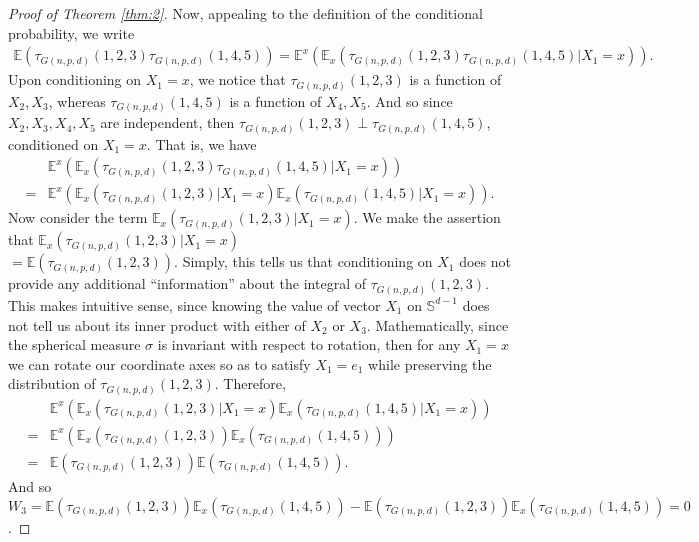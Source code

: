 \documentclass{article}
\begin{document}
\begin{proof}[Proof of Theorem \ref{thm:2}]
Now, appealing to the definition of the conditional probability, we write
\begin{align*}
    \mathbb{E} \left( \tau_{G(n,p,d)}(1,2,3)\tau_{G(n,p,d)}(1,4,5) \right) = \mathbb{E}^x\left(\mathbb{E}_x \left( \tau_{G(n,p,d)}(1,2,3)\tau_{G(n,p,d)}(1,4,5) | X_1 = x \right) \right).
\end{align*}
Upon conditioning on $X_1 = x$, we notice that $\tau_{G(n,p,d)}(1,2,3)$ is a function of $X_2, X_3$, whereas $\tau_{G(n,p,d)}(1,4,5)$ is a function of $X_4, X_5$. And so since $X_2, X_3, X_4, X_5$ are independent, then $\tau_{G(n,p,d)}(1,2,3) \perp \tau_{G(n,p,d)}(1,4,5)$, conditioned on $X_1 = x$. That is, we have
\begin{align*}
    &\mathbb{E}^x\left(\mathbb{E}_x \left( \tau_{G(n,p,d)}(1,2,3)\tau_{G(n,p,d)}(1,4,5) | X_1 = x \right) \right)\\
    =&\mathbb{E}^x\left(\mathbb{E}_x \left( \tau_{G(n,p,d)}(1,2,3)| X_1 = x \right) \mathbb{E}_x \left( \tau_{G(n,p,d)}(1,4,5)| X_1 = x \right)\right).
\end{align*}
Now consider the term $\mathbb{E}_x \left( \tau_{G(n,p,d)}(1,2,3)| X_1 = x \right)$. We make the assertion that $\mathbb{E}_x \left( \tau_{G(n,p,d)}(1,2,3)| X_1 = x \right)$\\ $= \mathbb{E} \left( \tau_{G(n,p,d)}(1,2,3)\right)$. Simply, this tells us that conditioning on $X_1$ does not provide any additional \enquote{information} about the integral of $\tau_{G(n,p,d)}(1,2,3)$. This makes intuitive sense, since knowing the value of vector $X_1$ on $\mathbb{S}^{d-1}$ does not tell us about its inner product with either of $X_2$ or $X_3$. Mathematically, since the spherical measure $\sigma$ is invariant with respect to rotation, then for any $X_1 = x$ we can rotate our coordinate axes so as to satisfy $X_1 = e_1$ while preserving the distribution of $\tau_{G(n,p,d)}(1,2,3)$. Therefore,
\begin{align*}
    &\mathbb{E}^x\left(\mathbb{E}_x \left( \tau_{G(n,p,d)}(1,2,3)| X_1 = x \right) \mathbb{E}_x \left( \tau_{G(n,p,d)}(1,4,5)| X_1 = x \right)\right)\\
    =& \mathbb{E}^x\left(\mathbb{E}_x \left( \tau_{G(n,p,d)}(1,2,3) \right) \mathbb{E}_x \left( \tau_{G(n,p,d)}(1,4,5) \right)\right)\\
    =& \mathbb{E} \left( \tau_{G(n,p,d)}(1,2,3) \right) \mathbb{E} \left( \tau_{G(n,p,d)}(1,4,5) \right).
\end{align*}
And so $W_3 = \mathbb{E} \left( \tau_{G(n,p,d)}(1,2,3) \right) \mathbb{E}_x \left( \tau_{G(n,p,d)}(1,4,5) \right) - \mathbb{E} \left( \tau_{G(n,p,d)}(1,2,3) \right) \mathbb{E}_x \left( \tau_{G(n,p,d)}(1,4,5) \right) = 0$.


\end{proof}
\end{document}
